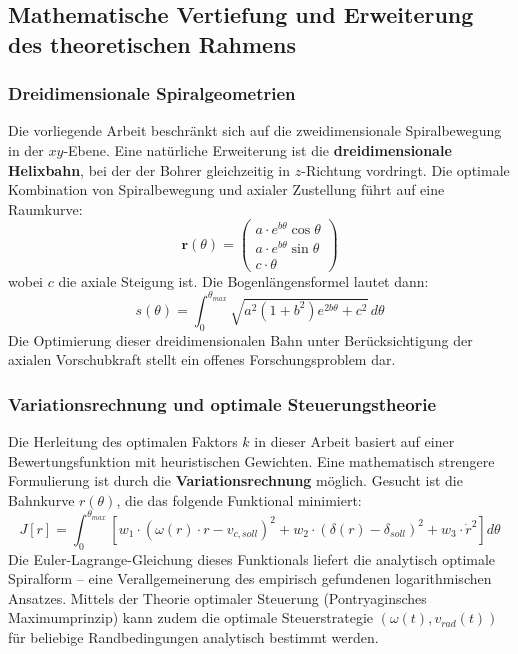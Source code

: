 ﻿\documentclass[12pt,a4paper]{article}
\begin{document}
\subsection{Mathematische Vertiefung und Erweiterung des theoretischen Rahmens}

\subsubsection{Dreidimensionale Spiralgeometrien}

Die vorliegende Arbeit beschränkt sich auf die zweidimensionale Spiralbewegung in der $xy$-Ebene. Eine natürliche Erweiterung ist die \textbf{dreidimensionale Helixbahn}, bei der der Bohrer gleichzeitig in $z$-Richtung vordringt. Die optimale Kombination von Spiralbewegung und axialer Zustellung führt auf eine Raumkurve:
\begin{equation}
    \mathbf{r}(\theta) = \begin{pmatrix} a \cdot e^{b\theta} \cos\theta \\ a \cdot e^{b\theta} \sin\theta \\ c \cdot \theta \end{pmatrix}
\end{equation}
wobei $c$ die axiale Steigung ist. Die Bogenlängensformel lautet dann:
\begin{equation}
    s(\theta) = \int_0^{\theta_{max}} \sqrt{a^2(1+b^2)e^{2b\theta} + c^2} \, d\theta
\end{equation}
Die Optimierung dieser dreidimensionalen Bahn unter Berücksichtigung der axialen Vorschubkraft stellt ein offenes Forschungsproblem dar.

\subsubsection{Variationsrechnung und optimale Steuerungstheorie}

Die Herleitung des optimalen Faktors $k$ in dieser Arbeit basiert auf einer Bewertungsfunktion mit heuristischen Gewichten. Eine mathematisch strengere Formulierung ist durch die \textbf{Variationsrechnung} möglich. Gesucht ist die Bahnkurve $r(\theta)$, die das folgende Funktional minimiert:
\begin{equation}
    J[r] = \int_0^{\theta_{max}} \left[ w_1 \cdot \left(\omega(r) \cdot r - v_{c,soll}\right)^2 + w_2 \cdot \left(\delta(r) - \delta_{soll}\right)^2 + w_3 \cdot \dot{r}^2 \right] d\theta
\end{equation}
Die Euler-Lagrange-Gleichung dieses Funktionals liefert die analytisch optimale Spiralform -- eine Verallgemeinerung des empirisch gefundenen logarithmischen Ansatzes. Mittels der Theorie optimaler Steuerung (Pontryaginsches Maximumprinzip) kann zudem die optimale Steuerstrategie $(\omega(t), v_{rad}(t))$ für beliebige Randbedingungen analytisch bestimmt werden.
\end{document}
